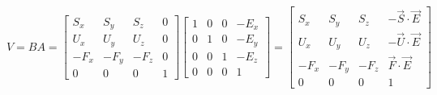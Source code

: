 \documentclass[UTF8]{ctexart}
\begin{document}
$V = BA = \begin{bmatrix} S_x & S_y & S_z & 0 \\
    U_x & U_y & U_z & 0 \\
    -F_x & -F_y & -F_z & 0 \\
    0   &   0 &    0 & 1 

\end{bmatrix} \begin{bmatrix} 1 & 0 & 0 & -E_x \\
    0 & 1 & 0 & -E_y \\
    0 & 0 & 1 & -E_z \\
    0   &   0 &    0 & 1 
\end{bmatrix}
= \begin{bmatrix} S_x & S_y & S_z & -\vec S \cdot \vec E \\
                          U_x & U_y & U_z & -\vec U \cdot \vec E \\
                          -F_x & -F_y & -F_z & \vec F \cdot \vec E \\
                          0 & 0 & 0 & 1
\end{bmatrix}$
\end{document}
